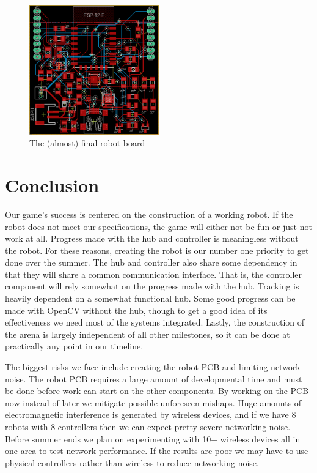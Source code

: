 \documentclass[11pt]{ieeeconf}
\begin{document}
\begin{figure}[h]
\centering
\captionsetup{justification=centering}
\includegraphics[width=0.5\textwidth]{images/RobotBoard.png}
\caption{The (almost) final robot board}
\label{roboboard}
\end{figure}

\section{Conclusion}
Our game’s success is centered on the construction of a working robot. If the robot does not meet our specifications, the game will either not be fun or just not work at all. Progress made with the hub and controller is meaningless without the robot. For these reasons, creating the robot is our number one priority to get done over the summer. The hub and controller also share some dependency in that they will share a common communication interface. That is, the controller component will rely somewhat on the progress made with the hub. Tracking is heavily dependent on a somewhat functional hub. Some good progress can be made with OpenCV without the hub, though to get a good idea of its effectiveness we need most of the systems integrated. Lastly, the construction of the arena is largely independent of all other milestones, so it can be done at practically any point in our timeline.

The biggest risks we face include creating the robot PCB and limiting network noise. The robot PCB requires a large amount of developmental time and must be done before work can start on the other components. By working on the PCB now instead of later we mitigate possible unforeseen mishaps. Huge amounts of electromagnetic interference is generated by wireless devices, and if we have 8 robots with 8 controllers then we can expect pretty severe networking noise. Before summer ends we plan on experimenting with 10+ wireless devices all in one area to test network performance. If the results are poor we may have to use physical controllers rather than wireless to reduce networking noise. 
\end{document}
